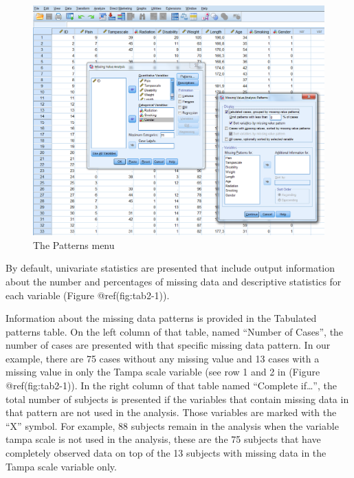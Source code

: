 \documentclass[
]{book}
\begin{document}
\begin{figure}

{\centering \includegraphics[width=0.9\linewidth]{images/fig2.4} 

}

\caption{The Patterns menu}\label{fig:fig2-4}
\end{figure}

By default, univariate statistics are presented that include output
information about the number and percentages of missing data and
descriptive statistics for each variable (Figure @ref(fig:tab2-1)).

Information about the missing data patterns is provided in the Tabulated
patterns table. On the left column of that table, named ``Number of
Cases'', the number of cases are presented with that specific missing
data pattern. In our example, there are 75 cases without any missing
value and 13 cases with a missing value in only the Tampa scale variable
(see row 1 and 2 in (Figure @ref(fig:tab2-1)). In the right column of
that table named ``Complete if\ldots{}'', the total number of subjects
is presented if the variables that contain missing data in that pattern
are not used in the analysis. Those variables are marked with the ``X''
symbol. For example, 88 subjects remain in the analysis when the
variable tampa scale is not used in the analysis, these are the 75
subjects that have completely observed data on top of the 13 subjects
with missing data in the Tampa scale variable only.
\end{document}
